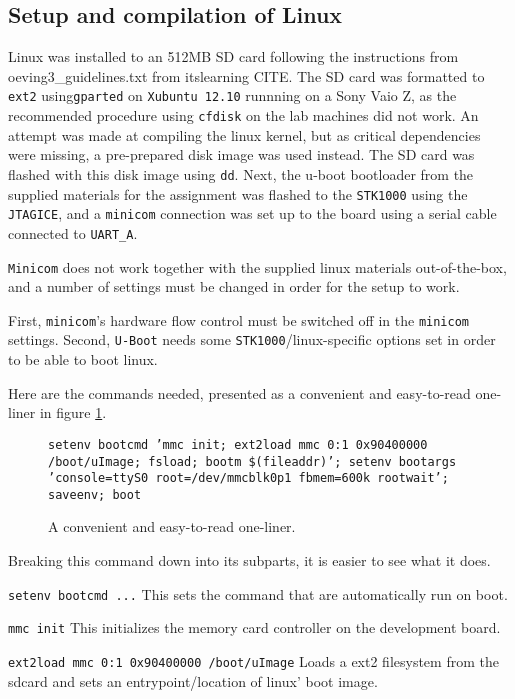 
\subsection{Setup and compilation of Linux}

Linux was installed to an 512MB SD card following the instructions from oeving3\_guidelines.txt from itslearning CITE. 
The SD card was formatted to \texttt{ext2} using\texttt{gparted} on \texttt{Xubuntu 12.10} runnning on a Sony Vaio Z, as the recommended procedure using \texttt{cfdisk} on the lab machines did not work.
An attempt was made at compiling the linux kernel, but as critical dependencies were missing, a pre-prepared disk image was used instead. The SD card was flashed with this disk image using \texttt{dd}.
Next, the u-boot bootloader from the supplied materials for the assignment was flashed to the \texttt{STK1000} using the \texttt{JTAGICE}, and a \texttt{minicom} connection was set up to the board using a serial cable connected to \texttt{UART\_A}.

\texttt{Minicom} does not work together with the supplied linux materials out-of-the-box, and a number of settings must be changed in order for the setup to work.


First, \texttt{minicom}'s hardware flow control must be switched off in the \texttt{minicom} settings.
Second, \texttt{U-Boot} needs some \texttt{STK1000}/linux-specific options set in order to be able to boot linux.


Here are the commands needed, presented as a convenient and easy-to-read one-liner in figure \ref{fig-ubootcommand}.


\begin{figure}
\texttt{setenv bootcmd 'mmc init; ext2load mmc 0:1 0x90400000 /boot/uImage; fsload; bootm \$(fileaddr)'; setenv bootargs 'console=ttyS0 root=/dev/mmcblk0p1 fbmem=600k rootwait'; saveenv; boot}
\label{fig-ubootcommand}
\caption{A convenient and easy-to-read one-liner.}
\end{figure}


Breaking this command down into its subparts, it is easier to see what it does.


\texttt{setenv bootcmd ...} 
This sets the command that are automatically run on boot.

\texttt{mmc init} 
This initializes the memory card controller on the development board.

\texttt{ext2load mmc 0:1 0x90400000 /boot/uImage} 
Loads a ext2 filesystem from the sdcard and sets an entrypoint/location of linux' boot image.

